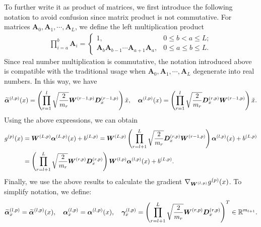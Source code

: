 To further write it as product of matrices, we first introduce the following notation to avoid confusion since matrix product is not commutative.
For matrices $\bm{A}_0,\bm{A}_1,\cdots,\bm{A}_L$, we define the left multiplication product
\begin{align*}
  \prod_{i=a}^b \bm{A}_i =
  \begin{cases}
    1,&0\leq b <a \leq L;\\
    \bm{A}_b \bm{A}_{b-1} \cdots \bm{A}_{a+1} \bm{A}_a,& 0 \leq a \leq b \leq L.
  \end{cases}
\end{align*}
Since real number multiplication is commutative, the notation introduced above is compatible with the traditional usage when $\bm{A}_0,\bm{A}_1, \cdots, \bm{A}_L$ degenerate into real numbers.
In this way, we have
\begin{align}
  \label{eq:NN_Layer_MatrixProductForm}
  \widetilde{\bm{\alpha}}^{(l,p)}(x) = \left(\prod_{r=1}^l \sqrt{\frac{2}{m_r}} \bm{W}^{(r-1,p)}\bm{D}^{(r-1,p)}_{x}\right) \tilde{x}, \quad
  {\bm{\alpha}}^{(l,p)}(x) = \left(\prod_{r=1}^{l} \sqrt{\frac{2}{m_r}} \bm{D}^{(r,p)}_{x} \bm{W}^{(r-1,p)}\right)\tilde{x}.
\end{align}
Using the above expressions, we can obtain
\begin{align*}
  g^{(p)}(x) &= \bm{W}^{(L,p)}{\bm{\alpha}}^{(L,p)}(x) + b^{(L,p)}=\bm{W}^{(L,p)}\left(\prod_{r=l+1}^{L} \sqrt{\frac{2}{m_r}} \bm{D}^{(r,p)}_{x} \bm{W}^{(r-1,p)}\right){\bm{\alpha}}^{(l,p)}(x) + b^{(L,p)}\\
  &=\left( \prod_{r=l+1}^{L} \sqrt{\frac{2}{m_{r}}} \bm{W}^{(r,p)}\bm{D}^{(r,p)}_{x} \right)\bm{W}^{(l,p)} {\bm{\alpha}}^{(l,p)}(x) + b^{(L,p)}.
\end{align*}
Finally, we use the above results to calculate the gradient $\nabla_{\bm{W}^{(l,p)}} g^{(p)}(x)$.
To simplify notation, we define:
\begin{align}
  \label{eq:def_gamma}
  \begin{split}
    \begin{gathered}
      \widetilde{\bm{\alpha}}^{(l,p)}_{\x}=\widetilde{\bm{\alpha}}^{(l,p)}\xkm{\x},
      \quad{\bm{\alpha}}^{(l,p)}_{\x}={\bm{\alpha}}^{(l,p)}\xkm{\x},
      \quad\bm{\gamma}^{(l,p)}_{\x}=\xk{\prod_{r=l+1}^{L} \sqrt{\frac2{m_r}}  \bm{W}^{(r,p)} \bm{D}^{(r,p)}_{\x}}^T\in\mb{R}^{m_{l+1}}.
    \end{gathered}
  \end{split}
\end{align}
